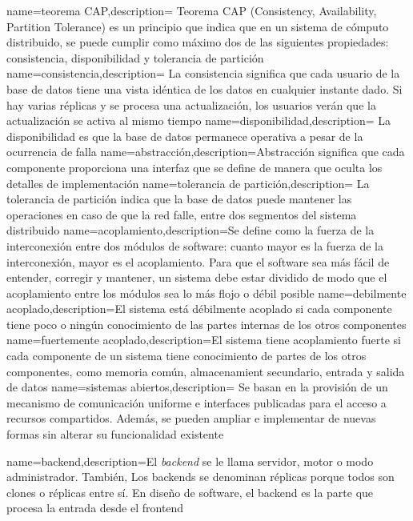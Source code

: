 {name={teorema CAP},description={ Teorema CAP (Consistency, Availability, Partition Tolerance) es un principio que indica que en un sistema de c\'omputo distribuido, se puede cumplir como m\'aximo dos de las siguientes propiedades: consistencia, disponibilidad y tolerancia de partici\'on }} 	
{name={consistencia},description={ La consistencia significa que cada usuario de la base de datos tiene una vista id\'entica de los datos en cualquier instante dado. Si hay varias r\'eplicas y se procesa una actualizaci\'on,   los usuarios ver\'an que la actualización se activa al mismo tiempo}} 	
{name={disponibilidad},description={ La disponibilidad es que la base de datos permanece operativa a pesar de la ocurrencia de falla }} 	
{name={abstracci\'on},description={Abstracci\'on significa que cada componente proporciona una interfaz que se define de manera que oculta los detalles de implementaci\'on}}		
{name={tolerancia de partici\'on},description={  La tolerancia de partici\'on indica que la base de datos puede mantener las operaciones  en caso de que la red falle, entre dos segmentos del sistema distribuido  }}
{name={acoplamiento},description={Se define como la fuerza de la interconexión entre dos módulos de software: cuanto mayor es la fuerza de la interconexión, mayor es el acoplamiento. Para que el software sea más f\'acil de entender, corregir y mantener, un sistema debe estar dividido de modo que el acoplamiento entre los módulos sea lo más flojo o d\'ebil posible}}
{name={debilmente acoplado},description={El sistema está débilmente acoplado si cada componente tiene poco o ningún conocimiento de las partes internas de los otros componentes}}
{name={fuertemente acoplado},description={El sistema tiene acoplamiento fuerte  si cada componente de un sistema tiene  conocimiento de partes de los otros componentes, como  memoria com\'un, almacenamient secundario, entrada y salida de datos}}
{name={sistemas abiertos},description={	Se basan en la provisión de un mecanismo de comunicación uniforme e interfaces publicadas para el acceso a recursos compartidos. Adem\'as, se pueden ampliar e implementar de nuevas formas sin alterar su funcionalidad existente}}

{name={backend},description={El \textit{backend} se le llama servidor, motor o modo administrador. Tambi\'en, Los backends se denominan r\'eplicas porque todos son clones o r\'eplicas entre s\'i. En dise\~no de software,  el backend es la parte que procesa la entrada desde el frontend}}


